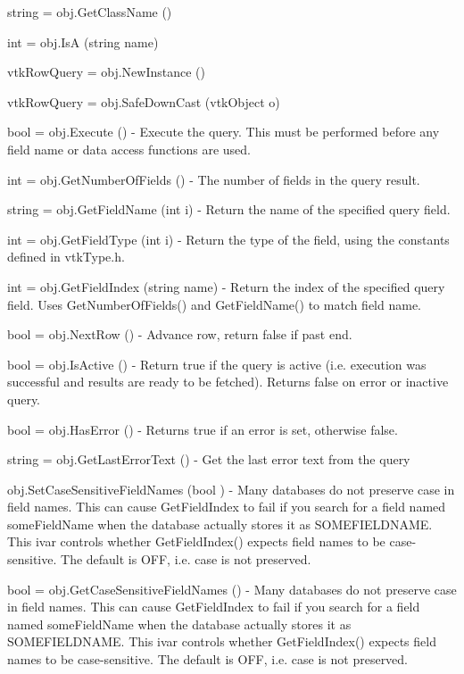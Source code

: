 \begin{DoxyItemize}
\item {\ttfamily string = obj.\-Get\-Class\-Name ()}  
\item {\ttfamily int = obj.\-Is\-A (string name)}  
\item {\ttfamily vtk\-Row\-Query = obj.\-New\-Instance ()}  
\item {\ttfamily vtk\-Row\-Query = obj.\-Safe\-Down\-Cast (vtk\-Object o)}  
\item {\ttfamily bool = obj.\-Execute ()} -\/ Execute the query. This must be performed before any field name or data access functions are used.  
\item {\ttfamily int = obj.\-Get\-Number\-Of\-Fields ()} -\/ The number of fields in the query result.  
\item {\ttfamily string = obj.\-Get\-Field\-Name (int i)} -\/ Return the name of the specified query field.  
\item {\ttfamily int = obj.\-Get\-Field\-Type (int i)} -\/ Return the type of the field, using the constants defined in vtk\-Type.\-h.  
\item {\ttfamily int = obj.\-Get\-Field\-Index (string name)} -\/ Return the index of the specified query field. Uses Get\-Number\-Of\-Fields() and Get\-Field\-Name() to match field name.  
\item {\ttfamily bool = obj.\-Next\-Row ()} -\/ Advance row, return false if past end.  
\item {\ttfamily bool = obj.\-Is\-Active ()} -\/ Return true if the query is active (i.\-e. execution was successful and results are ready to be fetched). Returns false on error or inactive query.  
\item {\ttfamily bool = obj.\-Has\-Error ()} -\/ Returns true if an error is set, otherwise false.  
\item {\ttfamily string = obj.\-Get\-Last\-Error\-Text ()} -\/ Get the last error text from the query  
\item {\ttfamily obj.\-Set\-Case\-Sensitive\-Field\-Names (bool )} -\/ Many databases do not preserve case in field names. This can cause Get\-Field\-Index to fail if you search for a field named some\-Field\-Name when the database actually stores it as S\-O\-M\-E\-F\-I\-E\-L\-D\-N\-A\-M\-E. This ivar controls whether Get\-Field\-Index() expects field names to be case-\/sensitive. The default is O\-F\-F, i.\-e. case is not preserved.  
\item {\ttfamily bool = obj.\-Get\-Case\-Sensitive\-Field\-Names ()} -\/ Many databases do not preserve case in field names. This can cause Get\-Field\-Index to fail if you search for a field named some\-Field\-Name when the database actually stores it as S\-O\-M\-E\-F\-I\-E\-L\-D\-N\-A\-M\-E. This ivar controls whether Get\-Field\-Index() expects field names to be case-\/sensitive. The default is O\-F\-F, i.\-e. case is not preserved.  

\end{DoxyItemize}

